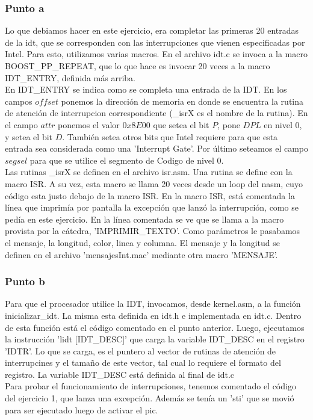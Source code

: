 \subsubsection*{Punto a}
Lo que debiamos hacer en este ejercicio, era completar las primeras 20 entradas de la idt, que se corresponden con las interrupciones que vienen especificadas por Intel.
Para esto, utilizamos varias macros. En el archivo idt.c se invoca a la macro BOOST\_PP\_REPEAT, que lo que hace es invocar 20 veces a la macro IDT\_ENTRY, definida más arriba.\\

En IDT\_ENTRY se indica como se completa una entrada de la IDT. En los campos $offset$ ponemos la dirección de memoria en donde se encuentra la rutina de atención de interrupcion correspondiente (\_isrX es el nombre de la rutina). En el campo $attr$ ponemos el valor $0x8E00$ que setea el bit $P$, pone $DPL$ en nivel 0, y setea el bit $D$. También setea otros bits que Intel requiere para que esta entrada sea considerada como una 'Interrupt Gate'. Por último seteamos el campo $segsel$ para que se utilice el segmento de Codigo de nivel 0.\\

Las rutinas \_isrX se definen en el archivo isr.asm. Una rutina se define con la macro ISR. A su vez, esta macro se llama 20 veces desde un loop del nasm, cuyo código esta justo debajo de la macro ISR. 
En la macro ISR, está comentada la línea que imprimía por pantalla la excepción que lanzó la interrupción, como se pedía en este ejercicio. En la línea comentada se ve que se llama a la macro provista por la cátedra, 'IMPRIMIR\_TEXTO'. Como parámetros le pasabamos el mensaje, la longitud, color, linea y columna. El mensaje y la longitud se definen en el archivo 'mensajesInt.mac' mediante otra macro 'MENSAJE'.

\subsubsection*{Punto b}
Para que el procesador utilice la IDT, invocamos, desde kernel.asm, a la función inicializar\_idt. La misma esta definida en idt.h e implementada en idt.c. Dentro de esta función está el código comentado en el punto anterior. Luego, ejecutamos la instrucción 'lidt [IDT\_DESC]' que carga la variable IDT\_DESC en el registro 'IDTR'. Lo que se carga, es el puntero al vector de rutinas de atención de interrupcines y el tamaño de este vector, tal cual lo requiere el formato del registro.
La variable IDT\_DESC está definida al final de idt.c\\
Para probar el funcionamiento de interrupciones, tenemos comentado el código del ejercicio 1, que lanza una excepción. Además se tenía un 'sti' que se movió para ser ejecutado luego de activar el pic.